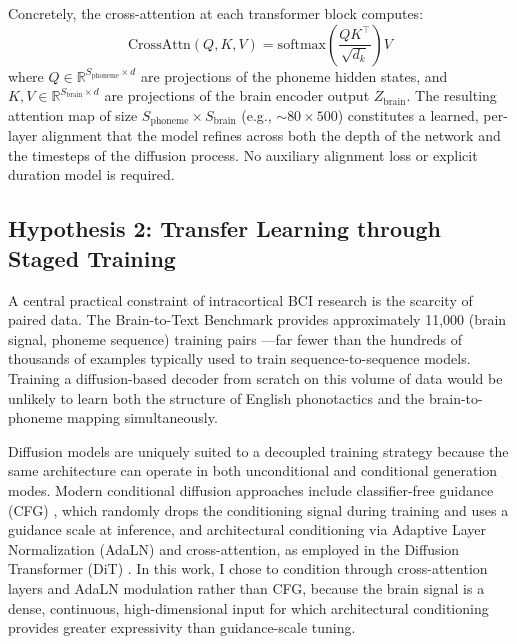\documentclass{article}
\begin{document}
Concretely, the cross-attention at each transformer block computes:
\begin{equation}
    \mathrm{CrossAttn}(Q, K, V) = \mathrm{softmax}\!\left(\frac{Q K^\top}{\sqrt{d_k}}\right) V
\end{equation}
where $Q \in \mathbb{R}^{S_{\text{phoneme}} \times d}$ are projections
of the phoneme hidden states, and
$K, V \in \mathbb{R}^{S_{\text{brain}} \times d}$ are projections of
the brain encoder output $Z_{\text{brain}}$.  The resulting attention
map of size $S_{\text{phoneme}} \times S_{\text{brain}}$ (e.g.,
${\sim}80 \times 500$) constitutes a learned, per-layer alignment that
the model refines across both the depth of the network and the
timesteps of the diffusion process.  No auxiliary alignment loss or
explicit duration model is required.
 
\subsection{Hypothesis 2: Transfer Learning through Staged Training}
\label{sec:transfer}
 
A central practical constraint of intracortical BCI research is the
scarcity of paired data.  The Brain-to-Text Benchmark provides
approximately 11{,}000 (brain signal, phoneme sequence) training
pairs \cite{willett2024lessons}---far fewer than the hundreds of
thousands of examples typically used to train sequence-to-sequence
models.  Training a diffusion-based decoder from scratch on this
volume of data would be unlikely to learn both the structure of
English phonotactics and the brain-to-phoneme mapping simultaneously.
 
Diffusion models are uniquely suited to a decoupled training strategy
because the same architecture can operate in both unconditional and
conditional generation modes.  Modern conditional diffusion approaches
include classifier-free guidance (CFG) \cite{ho2022classifierfree},
which randomly drops the conditioning signal during training and uses
a guidance scale at inference, and architectural conditioning via
Adaptive Layer Normalization (AdaLN) and cross-attention, as employed
in the Diffusion Transformer (DiT) \cite{peebles2022scalable}.  In
this work, I chose to condition through
cross-attention layers and AdaLN modulation rather than CFG, because
the brain signal is a dense, continuous, high-dimensional input for
which architectural conditioning provides greater expressivity than
guidance-scale tuning.
 
\end{document}
